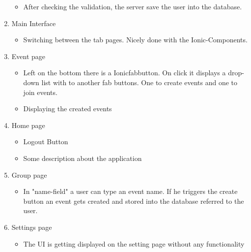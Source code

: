 \begin{enumerate}
\begin{itemize}
        \item After checking the validation, the server save the user into the database.
    \end{itemize}
    \item Main Interface
    \begin{itemize}
        \item Switching between the tab pages. Nicely done with the Ionic-Components.
    \end{itemize}
    \item Event page
    \begin{itemize}
        \item Left on the bottom there is a Ionicfabbutton. On click it displays a drop-down list with to another fab buttons. One to create events and one to join events.
        \item Displaying the created events
    \end{itemize}
    \item Home page
    \begin{itemize}
        \item Logout Button
        \item Some description about the application
    \end{itemize}
    \newpage
    \item Group page
    \begin{itemize}
        \item In "name-field" a user can type an event name. If he triggers the create button an event gets created and stored into the database referred to the user.
    \end{itemize}
    \item Settings page
    \begin{itemize}
        \item The UI is getting displayed on the setting page without any functionality
    \end{itemize}
\end{enumerate}
